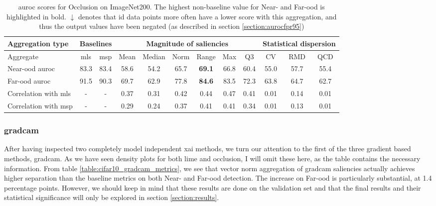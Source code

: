 \documentclass[UKenglish]{uiomasterthesis} %
\theoremstyle{definition}
\begin{document}
\begin{table}[hbtp]
\setlength\tabcolsep{3pt}
\begin{center}
\begin{tabular}{ |p{5.1em}|c c|c c c c c c|c c c| }
    \hline
     \centering Aggregation type & \multicolumn{2}{c|}{Baselines} & \multicolumn{6}{c|}{Magnitude of saliencies} & \multicolumn{3}{p{8em}|}{\centering Statistical dispersion} \\
    \hline
    Aggregate & \ac{mls} & \ac{msp} & Mean & Median & Norm & Range & Max & Q3 & CV & RMD & QCD  \\
    \hline
    \rowcolor{near!50}
    Near-\ac{ood} \ac{auroc} & 83.3 & 83.4 & 58.6 & 54.2 & 65.7 &\textbf{ 69.1 }& 66.8 & 60.4 & 55.0 & 57.7 & 55.4  \\
    \hline
    \rowcolor{far!50}
    Far-\ac{ood} \ac{auroc} & 91.5 & 90.3 & 69.7 & 62.9 & 77.8 &\textbf{ 84.6 }& 83.5 & 72.3 & 63.8 & 64.7 & 62.7  \\
    \hline
    Correlation with \ac{mls}& - & - & 0.37 & 0.31 & 0.42 & 0.44 & 0.47 & 0.41 & 0.01 & 0.14 & 0.01  \\
    \hline
    Correlation with \ac{msp}& - & - & 0.29 & 0.24 & 0.37 & 0.41 & 0.41 & 0.34 & 0.01 & 0.13 & 0.01  \\
    \hline
    \end{tabular}
    \caption[\ac{auroc} scores for Occlusion on ImageNet200]{\ac{auroc} scores for Occlusion on ImageNet200. The highest non-baseline value for Near- and Far-\ac{ood} is highlighted in bold. $\downarrow$ denotes that \ac{id} data points more often have a lower score with this aggregation, and thus the output values have been negated (as described in section \ref{section:aurocfpr95})}
    \label{table:imagenet200_occlusion_metrics}
\end{center}
\setlength\tabcolsep{6pt}
\end{table}

\subsubsection{\ac{gradcam}}

After having inspected two completely model independent \ac{xai} methods, we turn our attention to the first of the three gradient based methods, \ac{gradcam}. As we have seen density plots for both \ac{lime} and occlusion, I will omit these here, as the table contains the necessary information. From table \ref{table:cifar10_gradcam_metrics}, we see that vector norm aggregation of \ac{gradcam} saliencies actually achieves higher separation than the baseline metrics on both Near- and Far-\ac{ood} detection. The increase on Far-\ac{ood} is particularly substantial, at 1.4 percentage points. However, we should keep in mind that these results are done on the validation set and that the final results and their statistical significance will only be explored in section \ref{section:results}.
\end{document}
